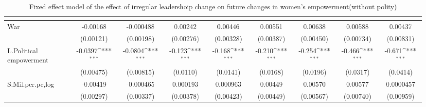 \begin{table}[htbp]\centering
\def\sym#1{\ifmmode^{#1}\else\(^{#1}\)\fi}
\caption{Fixed effect model of the effect of irregular leadershoip change on future changes in women's empowerment(without polity) \label{fepolempnopolity}}
\begin{tabular}{l*{8}{c}}
\hline\hline
                    &&&&&&&&\\
\hline
War                 &    -0.00168         &   -0.000488         &     0.00242         &     0.00446         &     0.00551         &     0.00638         &     0.00588         &     0.00437         \\
                    &   (0.00121)         &   (0.00198)         &   (0.00276)         &   (0.00328)         &   (0.00387)         &   (0.00450)         &   (0.00734)         &   (0.00831)         \\
[1em]
L.Political empowerment&     -0.0397\sym{***}&     -0.0804\sym{***}&      -0.123\sym{***}&      -0.168\sym{***}&      -0.210\sym{***}&      -0.254\sym{***}&      -0.466\sym{***}&      -0.671\sym{***}\\
                    &   (0.00475)         &   (0.00815)         &    (0.0110)         &    (0.0141)         &    (0.0168)         &    (0.0196)         &    (0.0317)         &    (0.0414)         \\
[1em]
S.Mil.per.pc,log    &    -0.00419         &   -0.000465         &    0.000193         &    0.000963         &     0.00449         &     0.00570         &     0.00577         &   0.0000457         \\
                    &   (0.00297)         &   (0.00337)         &   (0.00378)         &   (0.00423)         &   (0.00449)         &   (0.00567)         &   (0.00740)         &   (0.00959)         \\

\end{tabular}
\end{table}
